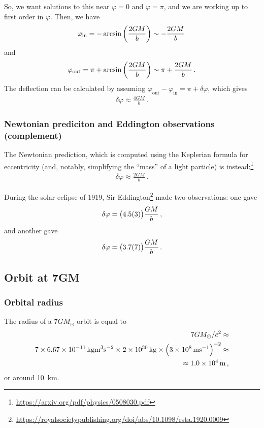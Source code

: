 \documentclass[main.tex]{subfiles}
\begin{document}
So, we want solutions to this near \(\varphi = 0\) and \(\varphi = \pi \), and we are working up to first order in \(\varphi \). Then, we have 
%
\begin{align}
  \varphi _{\text{in}} = - \arcsin \qty(\frac{2GM}{b}) 
  \sim - \frac{2GM}{b}
\,
\end{align}
%
and  
%
\begin{align}
  \varphi _{\text{out}}  = \pi + \arcsin \qty( \frac{2GM}{b}) \sim \pi + \frac{2GM}{b}
\,.
\end{align}
%
The deflection can be calculated by assuming \( \varphi _{\text{out}} - \varphi _{\text{in}} = \pi + \delta \varphi \), which gives 
%
\begin{align}
  \delta \varphi \approx \frac{4GM}{b}
\,.
\end{align}
%

\subsubsection{Newtonian prediciton and Eddington observations (complement)}

The Newtonian prediction, which is computed using the Keplerian formula for eccentricity (and, notably, simplifying the ``mass'' of a light particle) is instead:\footnote{\url{https://arxiv.org/pdf/physics/0508030.pdf}}
%
\begin{align}
  \delta \varphi \approx \frac{2GM}{b}
\,.
\end{align}

During the solar eclipse of 1919, Sir Eddington\footnote{\url{https://royalsocietypublishing.org/doi/abs/10.1098/rsta.1920.0009}} made two observations: one gave 
%
\begin{align}
  \delta \varphi = \qty(\SI{4.5(3)}{}) \frac{GM}{b}
\,,
\end{align}
%
and another gave 
%
\begin{align}
  \delta \varphi = \qty(\SI{3.7(7)}{}) \frac{GM}{b}
\,.
\end{align}
%

\subsection{Orbit at 7GM}

\subsubsection{Orbital radius}

The radius of a \(7G M_{\odot}\) orbit is equal to 
%
\begin{subequations}
\begin{align}
  7GM_{\odot}/c^2 \approx\\
  7 \times \SI{6.67e-11}{kg m^{3} s^{-2}} \times \SI{2e30}{kg} \times \qty(\SI{3e8}{ms^{-1}})^{-2} \approx \\
  \approx \SI{1.0e4}{m}
\,,
\end{align}
\end{subequations}
%
or around \SI{10}{km}. 
\end{document}
